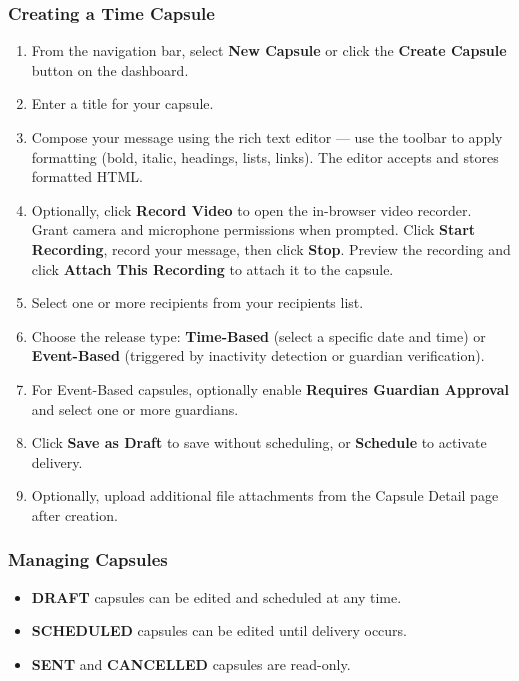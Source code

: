 \documentclass[12pt, a4paper]{article}
\begin{document}
\begin{appendices}
\subsubsection{Creating a Time Capsule}

\begin{enumerate}
  \item From the navigation bar, select \textbf{New Capsule} or click the \textbf{Create Capsule} button on the dashboard.
  \item Enter a title for your capsule.
  \item Compose your message using the rich text editor — use the toolbar to apply formatting (bold, italic, headings, lists, links). The editor accepts and stores formatted HTML.
  \item Optionally, click \textbf{Record Video} to open the in-browser video recorder. Grant camera and microphone permissions when prompted. Click \textbf{Start Recording}, record your message, then click \textbf{Stop}. Preview the recording and click \textbf{Attach This Recording} to attach it to the capsule.
  \item Select one or more recipients from your recipients list.
  \item Choose the release type: \textbf{Time-Based} (select a specific date and time) or \textbf{Event-Based} (triggered by inactivity detection or guardian verification).
  \item For Event-Based capsules, optionally enable \textbf{Requires Guardian Approval} and select one or more guardians.
  \item Click \textbf{Save as Draft} to save without scheduling, or \textbf{Schedule} to activate delivery.
  \item Optionally, upload additional file attachments from the Capsule Detail page after creation.
\end{enumerate}

\subsubsection{Managing Capsules}

\begin{itemize}
  \item \textbf{DRAFT} capsules can be edited and scheduled at any time.
  \item \textbf{SCHEDULED} capsules can be edited until delivery occurs.
  \item \textbf{SENT} and \textbf{CANCELLED} capsules are read-only.
\end{itemize}


\end{appendices}
\end{document}
